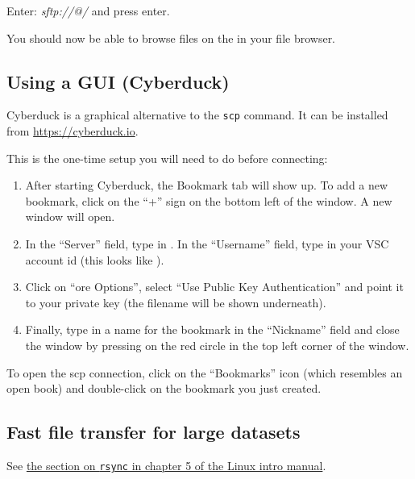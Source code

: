   Enter: \emph{sftp://\userid{}@\loginnode/} and press enter.

  You should now be able to browse files on the \hpc in your file browser.
\fi

\ifmac
  \subsection{Using a GUI (Cyberduck)}

  Cyberduck is a graphical alternative to the \lstinline|scp| command. It can be installed
  from \url{https://cyberduck.io}.

  This is the one-time setup you will need to do before connecting:

  \begin{enumerate}
      \item After starting Cyberduck, the Bookmark tab will show up. To add a new
        bookmark, click on the ``+'' sign on the bottom left of the window. A new window will open.
      \item In the ``Server'' field, type in \texttt{\loginnode}. In the ``Username'' field,
        type in your VSC account id (this looks like \texttt{\userid}).
      \item Click on ``ore Options'', select ``Use Public Key Authentication'' and point
        it to your private key (the filename will be shown underneath).
      \item Finally, type in a name for the bookmark in the ``Nickname'' field and
        close the window by pressing on the red circle in the top left corner of the window.
  \end{enumerate}

  To open the scp connection, click on the ``Bookmarks'' icon (which resembles an
  open book) and double-click on the bookmark you just created.

\fi

\subsection{Fast file transfer for large datasets}

See \href{\LinuxManualURL#sec:rsync}{the section on \texttt{rsync} in chapter 5 of the Linux intro manual}.

